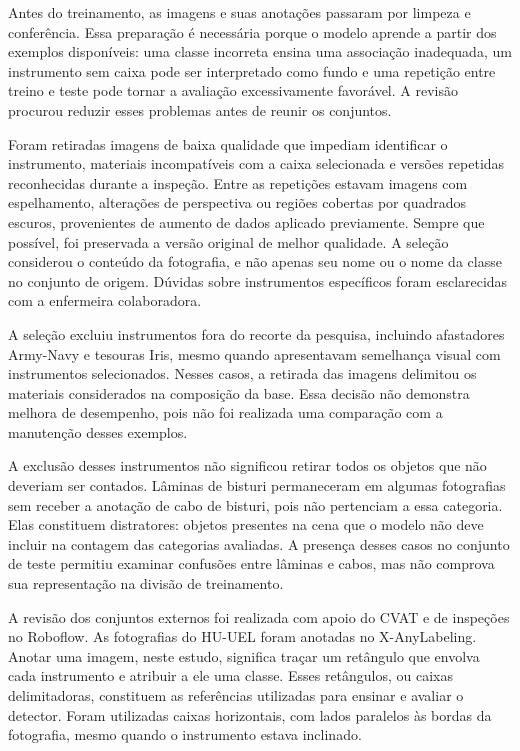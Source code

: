 Antes do treinamento, as imagens e suas anotações passaram por limpeza e conferência. Essa preparação é necessária porque o modelo aprende a partir dos exemplos disponíveis: uma classe incorreta ensina uma associação inadequada, um instrumento sem caixa pode ser interpretado como fundo e uma repetição entre treino e teste pode tornar a avaliação excessivamente favorável. A revisão procurou reduzir esses problemas antes de reunir os conjuntos.

Foram retiradas imagens de baixa qualidade que impediam identificar o instrumento, materiais incompatíveis com a caixa selecionada e versões repetidas reconhecidas durante a inspeção. Entre as repetições estavam imagens com espelhamento, alterações de perspectiva ou regiões cobertas por quadrados escuros, provenientes de aumento de dados aplicado previamente. Sempre que possível, foi preservada a versão original de melhor qualidade. A seleção considerou o conteúdo da fotografia, e não apenas seu nome ou o nome da classe no conjunto de origem. Dúvidas sobre instrumentos específicos foram esclarecidas com a enfermeira colaboradora.

A seleção excluiu instrumentos fora do recorte da pesquisa, incluindo afastadores Army-Navy e tesouras Iris, mesmo quando apresentavam semelhança visual com instrumentos selecionados. Nesses casos, a retirada das imagens delimitou os materiais considerados na composição da base. Essa decisão não demonstra melhora de desempenho, pois não foi realizada uma comparação com a manutenção desses exemplos.

A exclusão desses instrumentos não significou retirar todos os objetos que não deveriam ser contados. Lâminas de bisturi permaneceram em algumas fotografias sem receber a anotação de cabo de bisturi, pois não pertenciam a essa categoria. Elas constituem distratores: objetos presentes na cena que o modelo não deve incluir na contagem das categorias avaliadas. A presença desses casos no conjunto de teste permitiu examinar confusões entre lâminas e cabos, mas não comprova sua representação na divisão de treinamento.

A revisão dos conjuntos externos foi realizada com apoio do CVAT e de inspeções no Roboflow. As fotografias do HU-UEL foram anotadas no X-AnyLabeling. Anotar uma imagem, neste estudo, significa traçar um retângulo que envolva cada instrumento e atribuir a ele uma classe. Esses retângulos, ou caixas delimitadoras, constituem as referências utilizadas para ensinar e avaliar o detector. Foram utilizadas caixas horizontais, com lados paralelos às bordas da fotografia, mesmo quando o instrumento estava inclinado.

